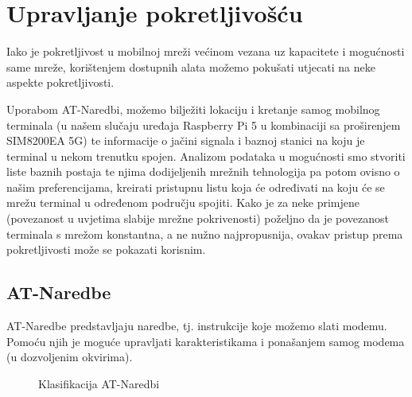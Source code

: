 \documentclass[zavrsnirad]{fer}
\begin{document}
\section{Upravljanje pokretljivošću}
\label{dio:upravljanje_pokretljivoscu}

Iako je pokretljivost u mobilnoj mreži većinom vezana uz kapacitete i mogućnosti same mreže,
korištenjem dostupnih alata možemo pokušati utjecati na neke aspekte pokretljivosti.

Uporabom AT-Naredbi, možemo bilježiti lokaciju i kretanje samog mobilnog terminala (u našem slučaju
uređaja Raspberry Pi 5 u kombinaciji sa proširenjem SIM8200EA 5G) te informacije o jačini signala i 
baznoj stanici na koju je terminal u nekom trenutku spojen. Analizom podataka u mogućnosti smo
stvoriti liste baznih postaja te njima dodijeljenih mrežnih tehnologija pa potom ovisno o našim
preferencijama, kreirati pristupnu listu koja će određivati na koju će se mrežu terminal u određenom
području spojiti. Kako je za neke primjene (povezanost u uvjetima slabije mrežne pokrivenosti) poželjno da je
povezanost terminala s mrežom konstantna, a ne nužno najpropusnija, ovakav pristup prema pokretljivosti može se pokazati
korisnim.

\subsection{AT-Naredbe}
\label{poddio:at_naredbe}

AT-Naredbe predstavljaju naredbe, tj. instrukcije koje možemo slati modemu. Pomoću njih je moguće
upravljati karakteristikama i ponašanjem samog modema (u dozvoljenim okvirima). 

\begin{figure}[h!]
  \centering
  \caption{Klasifikacija AT-Naredbi}
  \label{fig:at-naredbe}
\end{figure}
\end{document}
